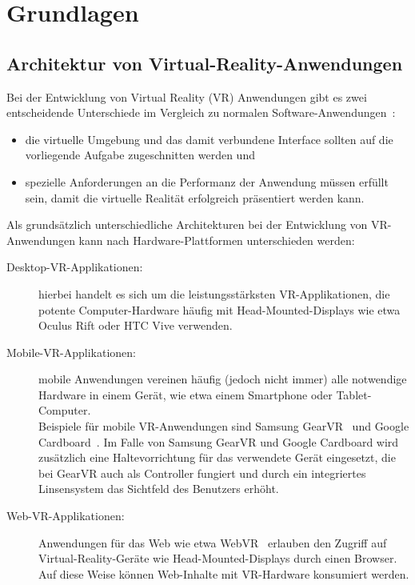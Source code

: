 \section{Grundlagen}
\subsection{Architektur von Virtual-Reality-Anwendungen}\label{sec:ArchitekturAnwendungen}
Bei der Entwicklung von Virtual Reality (VR) Anwendungen gibt es zwei entscheidende Unterschiede im Vergleich zu normalen Software-Anwendungen~\cite{bryson1995approaches}:
\begin{itemize}
	\item die virtuelle Umgebung und das damit verbundene Interface sollten auf die vorliegende Aufgabe zugeschnitten werden und
	\item spezielle Anforderungen an die Performanz der Anwendung müssen erfüllt sein, damit die virtuelle Realität erfolgreich präsentiert werden kann.
\end{itemize}

Als grundsätzlich unterschiedliche Architekturen bei der Entwicklung von VR-An\-wen\-dung\-en kann nach Hardware-Plattformen unterschieden werden:
\begin{description}
	\item[Desktop-VR-Applikationen:] hierbei handelt es sich um die leistungsstärksten VR-Applikationen, die potente Computer-Hardware häufig mit Head-Mounted-Displays wie etwa Oculus Rift oder HTC Vive verwenden.
	\item[Mobile-VR-Applikationen:] mobile Anwendungen vereinen häufig (jedoch nicht immer) alle notwendige Hardware in einem Gerät, wie etwa einem Smartphone oder Tablet-Computer.\\ Beispiele für mobile VR-Anwendungen sind Samsung GearVR~\cite{website:gearVRpressRelease} und Google Cardboard~\cite{website:googleCardboard}. Im Falle von Samsung GearVR und Google Cardboard wird zusätzlich eine Haltevorrichtung für das verwendete Gerät eingesetzt, die bei GearVR auch als Controller fungiert und durch ein integriertes Linsensystem das Sichtfeld des Benutzers erhöht.
	\item[Web-VR-Applikationen:] Anwendungen für das Web wie etwa WebVR~\cite{website:webVR} erlauben den Zugriff auf Virtual-Reality-Geräte wie Head-Mounted-Displays durch einen Browser. Auf diese Weise können Web-Inhalte mit VR-Hardware konsumiert werden.
\end{description}

